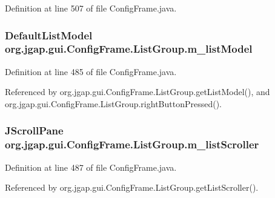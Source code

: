 Definition at line 507 of file Config\-Frame.\-java.

\hypertarget{classorg_1_1jgap_1_1gui_1_1_config_frame_1_1_list_group_a81d5c0b9d3ee2b427334acb2409d2d83}{
\subsubsection[{m\-\_\-list\-Model}]{\setlength{\rightskip}{0pt plus 5cm}Default\-List\-Model org.\-jgap.\-gui.\-Config\-Frame.\-List\-Group.\-m\-\_\-list\-Model\hspace{0.3cm}{\ttfamily [private]}}}\label{classorg_1_1jgap_1_1gui_1_1_config_frame_1_1_list_group_a81d5c0b9d3ee2b427334acb2409d2d83}


Definition at line 485 of file Config\-Frame.\-java.



Referenced by org.\-jgap.\-gui.\-Config\-Frame.\-List\-Group.\-get\-List\-Model(), and org.\-jgap.\-gui.\-Config\-Frame.\-List\-Group.\-right\-Button\-Pressed().

\hypertarget{classorg_1_1jgap_1_1gui_1_1_config_frame_1_1_list_group_a5b2e39f563ff0c708c8119bc42281a53}{
\subsubsection[{m\-\_\-list\-Scroller}]{\setlength{\rightskip}{0pt plus 5cm}J\-Scroll\-Pane org.\-jgap.\-gui.\-Config\-Frame.\-List\-Group.\-m\-\_\-list\-Scroller\hspace{0.3cm}{\ttfamily [private]}}}\label{classorg_1_1jgap_1_1gui_1_1_config_frame_1_1_list_group_a5b2e39f563ff0c708c8119bc42281a53}


Definition at line 487 of file Config\-Frame.\-java.



Referenced by org.\-jgap.\-gui.\-Config\-Frame.\-List\-Group.\-get\-List\-Scroller().

